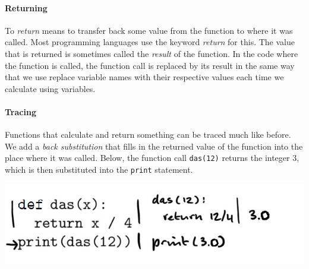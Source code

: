 \paragraph{Returning}

To \emph{return} means to transfer back some value from the function to where it was called. Most programming languages use the keyword \emph{return} for this. The value that is returned is sometimes called the \emph{result} of the function. In the code where the function is called, the function call is replaced by its result in the same way that we use replace variable names with their respective values each time we calculate using variables.

\paragraph{Tracing}

Functions that calculate and return something can be traced much like before. We add a \emph{back substitution} that fills in the returned value of the function into the place where it was called. Below, the function call \texttt{das(12)} returns the integer 3, which is then substituted into the \texttt{print} statement.

\includegraphics[width=.7\textwidth]{6-trace-returns.jpeg}
